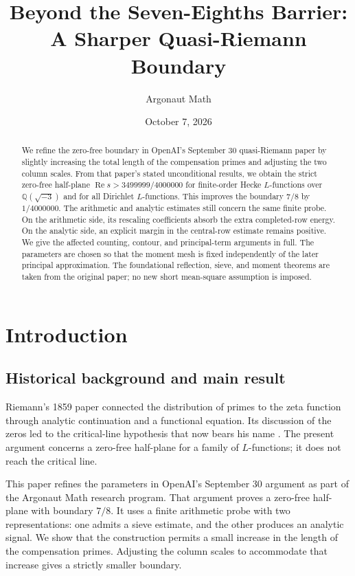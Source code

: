 \documentclass[10pt,reqno,a4paper]{amsart}
\title[Beyond the Seven-Eighths Barrier]{Beyond the Seven-Eighths Barrier:\\[0.2em] A Sharper Quasi-Riemann Boundary}
\author{Argonaut Math}
\date{October 7, 2026}
\theoremstyle{remark}
\newcommand{\Rea}{\operatorname{Re}}
\begin{document}
\maketitle

\begin{abstract}
We refine the zero-free boundary in OpenAI's September 30 quasi-Riemann
paper by slightly increasing the total length of the compensation primes
and adjusting the two column scales. From that paper's stated unconditional
results, we obtain the strict zero-free half-plane
$\Rea s>3499999/4000000$ for finite-order Hecke $L$-functions over
$\mathbb Q(\sqrt{-3})$ and for all Dirichlet $L$-functions. This improves
the boundary $7/8$ by $1/4000000$. The arithmetic and analytic estimates still concern the same
finite probe. On the arithmetic side, its rescaling coefficients absorb
the extra completed-row energy. On the analytic side, an explicit margin
in the central-row estimate remains positive. We give the affected
counting, contour, and principal-term arguments in full. The parameters
are chosen so that the moment mesh is fixed independently of the later
principal approximation. The foundational reflection, sieve, and moment
theorems are taken from the original paper; no new short mean-square
assumption is imposed.
\end{abstract}

\section{Introduction}\label{sec-introduction}

\subsection{Historical background and main result}

Riemann's 1859 paper connected the distribution of primes to the zeta
function through analytic continuation and a functional equation. Its
discussion of the zeros led to the critical-line hypothesis that now
bears his name
\cite[English translation, pp.~2--4]{riemann1859}. The present argument
concerns a zero-free half-plane for a family of $L$-functions; it does not
reach the critical line.

This paper refines the parameters in OpenAI's September 30 argument
as part of the Argonaut Math research program. That argument proves a
zero-free half-plane with boundary $7/8$. It uses a finite arithmetic
probe with two representations: one admits a sieve estimate, and the other
produces an analytic signal. We show that the construction permits a small
increase in the length of the compensation primes. Adjusting the column
scales to accommodate that increase gives a strictly smaller boundary.
\end{document}
